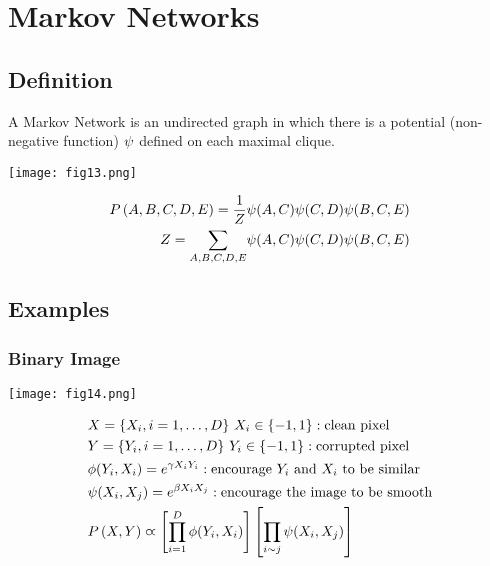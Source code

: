 \section{Markov Networks}

\subsection{Definition}
A Markov Network is an undirected graph in which there is a potential (non-negative function) $\psi$ defined on each maximal clique.

\begin{minipage}{0.4\textwidth}
	\centering
	\texttt{[image: fig13.png]}
\end{minipage}
\begin{minipage}{0.6\textwidth}
	\begin{align*}
	P\left(A,B,C,D,E\right)=\frac{1}{Z}&\psi(A,C)\psi(C,D)\psi(B,C,E) \\
	Z=\sum_{A,B,C,D,E}&\psi(A,C)\psi(C,D)\psi(B,C,E)
	\end{align*}
\end{minipage}

\subsection{Examples}

\subsubsection*{Binary Image}
\begin{minipage}{0.4\textwidth}
	\centering
	\texttt{[image: fig14.png]}
\end{minipage}
\begin{minipage}{0.6\textwidth}
	\begin{align*}
	&X=\{X_i,i=1,\dotsc,D\}\ X_i\in\{-1,1\}: \text{clean pixel} \\
	&Y=\{Y_i,i=1,\dotsc,D\}\ Y_i\in\{-1,1\}: \text{corrupted pixel} \\
	&\phi(Y_i,X_i)=e^{\gamma X_i Y_i}: \text{encourage $Y_i$ and $X_i$ to be similar} \\
	&\psi(X_i,X_j)=e^{\beta X_i X_j}: \text{encourage the image to be smooth} \\
	&P\left(X,Y\right)\varpropto\left[\prod_{i=1}^D\phi(Y_i,X_i)\right]\left[\prod_{i\sim j}\psi(X_i,X_j)\right]
	\end{align*}
\end{minipage}

